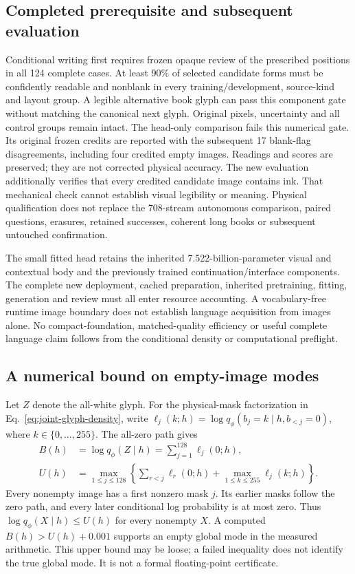 \documentclass[12pt,a4paper]{article}
\providecommand{\DIFadd}[1]{{\protect\color{blue} \sf #1}} %
\begin{document}
\subsection*{\DIFadd{Completed prerequisite and subsequent evaluation}}
\DIFadd{Conditional writing first requires frozen opaque review of the prescribed
positions in all 124 complete cases. At least 90\% of selected candidate forms
must be confidently readable and nonblank in every training/development,
source-kind and layout group. A legible alternative book glyph can pass this
component gate without matching the canonical next glyph. Original pixels,
uncertainty and all control groups remain intact. The head-only comparison
fails this numerical gate. Its original frozen credits are reported with the
subsequent 17 blank-flag disagreements, including four credited empty images.
Readings and scores are preserved; they are not corrected physical accuracy.
The new evaluation additionally verifies that every credited candidate image
contains ink. That mechanical check cannot establish visual legibility or
meaning. Physical qualification does not replace the 708-stream autonomous
comparison, paired questions, erasures,
retained successes, coherent long books or subsequent untouched confirmation.
}

\DIFadd{The small fitted head retains the inherited 7.522-billion-parameter visual and
contextual body and the previously trained continuation/interface components.
The complete new deployment, cached preparation, inherited pretraining, fitting,
generation and review must all enter resource accounting. A vocabulary-free
runtime image boundary does not establish language acquisition from images
alone. No compact-foundation, matched-quality efficiency or useful complete
language claim follows from the conditional density or computational preflight.
}

\subsection*{\DIFadd{A numerical bound on empty-image modes}}

\DIFadd{Let $Z$ denote the all-white glyph. For the physical-mask factorization in
Eq.~\ref{eq:joint-glyph-density}, write
$\ell_j(k;h)=\log q_\phi(b_j=k\mid h,b_{<j}=0)$, where $k\in\{0,\ldots,255\}$.
The all-zero path gives
}\begin{equation}
 \begin{aligned}
 B(h)&=\log q_\phi(Z\mid h)=\sum_{j=1}^{128}\ell_j(0;h),\\
 U(h)&=\max_{1\le j\le128}\left\{
       \sum_{r<j}\ell_r(0;h)
       +\max_{1\le k\le255}\ell_j(k;h)\right\}.
 \end{aligned}
 \label{eq:empty-glyph-bound}
\end{equation}
\DIFadd{Every nonempty image has a first nonzero mask $j$. Its earlier masks follow
the zero path, and every later conditional log probability is at most zero.
Thus $\log q_\phi(X\mid h)\le U(h)$ for every nonempty $X$. A computed
$B(h)>U(h)+0.001$ supports an empty global mode in the measured arithmetic.
This upper bound may be loose; a failed inequality does not identify the true
global mode. It is not a formal floating-point certificate.
}
\end{document}
